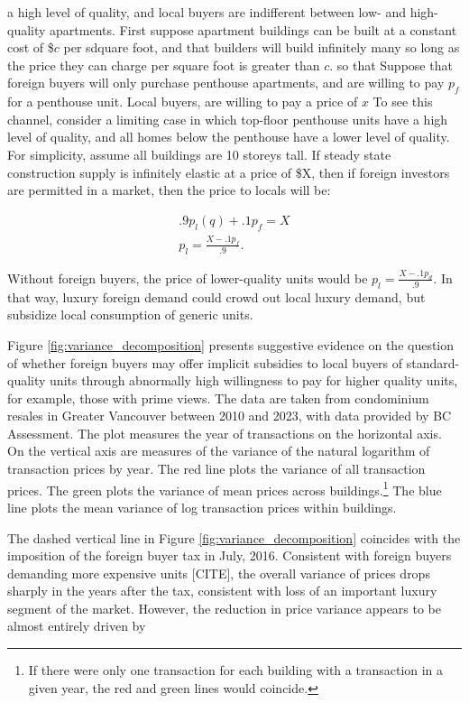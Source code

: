 \documentclass[12pt]{article}
\begin{document}
a high level of quality, and local buyers are indifferent between low- and high-quality apartments. First suppose apartment buildings can be built at a constant cost of \$$c$ per sdquare foot, and that builders will build infinitely many so long as the price they can charge per square foot is greater than $c$. so that Suppose that foreign buyers will only purchase penthouse apartments, and are willing to pay $p_{f}$ for a penthouse unit. Local buyers, are willing to pay a price of $x$
To see this channel, consider a limiting case
in which top-floor penthouse units have a high level of quality, and all homes
below the penthouse have a lower level of quality. For simplicity, assume all
buildings are 10 storeys tall. If steady state construction supply is
infinitely elastic at a price of \$X, then if foreign investors are permitted
in a market, then the price to locals will be:

\begin{align}
	.9p_{l}(q) + .1p_{f} = X\\
	p_{l} = \frac{X - .1p_{f}}{.9}.
\end{align}

Without foreign buyers, the price of lower-quality units would be $p_{l} =
\frac{X-.1p_{d}}{.9}$. In that way, luxury foreign demand could crowd out local
luxury demand, but subsidize local consumption of generic units.

Figure \ref{fig:variance_decomposition} presents suggestive evidence on the question of
whether foreign buyers may offer implicit subsidies to local buyers of
standard-quality units through abnormally high willingness to pay for higher
quality units, for example, those with prime views. The data are taken from
condominium resales in Greater Vancouver between 2010 and 2023, with data
provided by BC Assessment. The plot measures the year of transactions on the
horizontal axis. On the vertical axis are measures of the variance of the
natural logarithm of transaction prices by year. The red line plots the
variance of all transaction prices. The green plots the variance of mean prices
across buildings.\footnote{If there were only one transaction for each building
with a transaction in a given year, the red and green lines would coincide.}
The blue line plots the mean variance of log transaction prices within
buildings. 

The dashed vertical line in Figure \ref{fig:variance_decomposition} coincides
with the imposition of the foreign buyer tax in July, 2016. Consistent with
foreign buyers demanding more expensive units [CITE], the overall variance of
prices drops sharply in the years after the tax, consistent with loss of an important luxury
segment of the market. However, the reduction in price variance appears to be
almost entirely driven by
\end{document}

